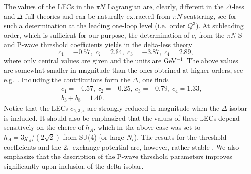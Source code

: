 \documentclass[aps,rmp,nofootinbib,twocolumn,floatfix]{revtex4}
\newcommand{\beqa}{\begin{eqnarray}}
\newcommand{\eeqa}{\end{eqnarray}}
\newcommand{\nn}{\nonumber \\ }
\begin{document}
The values of the LECs in the $\pi N$ Lagrangian are, clearly, different in
the $\Delta$-less  and
$\Delta$-full theories and can be naturally extracted from $\pi N$ scattering,
see \cite{Fettes:2000bb} for such a determination at the leading one-loop
level (i.e.~order $Q^3$). At subleading order, which is sufficient for our
purpose, the determination of 
$c_i$ from the $\pi N$ S- and P-wave threshold coefficients yields in the
delta-less theory \cite{Krebs:2007rh}
\begin{equation}
\label{ci_deltaless}
c_1 = -0.57, \;
c_2 = 2.84, \;  
c_3 = -3.87, \;  
c_4 = 2.89,
\end{equation}
where only central values are given and the units are GeV$^{-1}$. The above values are somewhat
smaller in magnitude than  the ones obtained at higher orders, see
e.g.~\cite{Fettes:1998ud}. Including the contributions form the
$\Delta$, one finds  
\beqa
\label{ci_deltafull}
&& c_1 = -0.57, \;   
c_2 = -0.25, \;  
c_3 = -0.79, \;  
c_4 = 1.33, \nn 
&& b_3 + b_8 = 1.40\, .
\eeqa
Notice that the LECs $c_{2,3,4}$ are strongly reduced in magnitude when the
$\Delta$-isobar is included. It should also be emphasized that the values 
of these LECs depend sensitively on the choice of $h_A$, which in the above
case was set to $h_A = 3 g_A/(2 \sqrt{2})$ from SU(4) (or large $N_c$). The results for the
threshold coefficients and the $2\pi$-exchange potential are, however, rather stable
\cite{Krebs:2007rh}. We also emphasize that the description of the P-wave threshold parameters 
improves significantly upon inclusion of the delta-isobar.   
\end{document}
